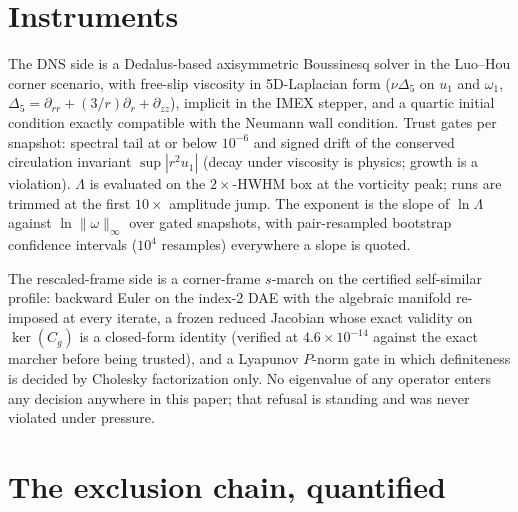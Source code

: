 \documentclass[11pt]{article}
\newcommand{\om}{\omega}
\newcommand{\vinf}{\|\om\|_\infty}
\newcommand{\Lam}{\Lambda}
\begin{document}
\section{Instruments}\label{sec:instruments}

The DNS side is a Dedalus-based axisymmetric Boussinesq solver in the
Luo--Hou corner scenario, with free-slip viscosity in 5D-Laplacian form
($\nu\Delta_5$ on $u_1$ and $\om_1$, $\Delta_5=\partial_{rr}
+(3/r)\partial_r+\partial_{zz}$), implicit in the IMEX stepper, and a
quartic initial condition exactly compatible with the Neumann wall
condition. Trust gates per snapshot: spectral tail at or below $10^{-6}$
and signed drift of the conserved circulation invariant $\sup|r^2u_1|$
(decay under viscosity is physics; growth is a violation). $\Lam$ is evaluated on the $2\times$-HWHM box at the vorticity
peak; runs are trimmed at the first $10\times$ amplitude jump. The
exponent is the slope of $\ln\Lam$ against $\ln\vinf$ over gated
snapshots, with pair-resampled bootstrap confidence intervals ($10^4$
resamples) everywhere a slope is quoted.

The rescaled-frame side is a corner-frame $s$-march on the certified
self-similar profile: backward Euler on the index-2 DAE with the algebraic
manifold re-imposed at every iterate, a frozen reduced Jacobian whose
exact validity on $\ker(C_g)$ is a closed-form identity (verified at
$4.6\times10^{-14}$ against the exact marcher before being trusted), and a
Lyapunov $P$-norm gate in which definiteness is decided by Cholesky
factorization only. No eigenvalue of any operator enters any decision
anywhere in this paper; that refusal is standing and was never violated
under pressure.

\section{The exclusion chain, quantified}\label{sec:chain}
\end{document}
